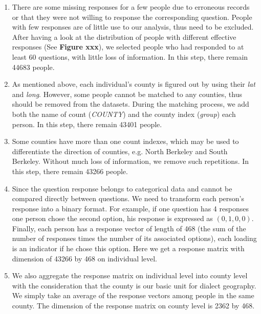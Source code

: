 \begin{enumerate}
\item There are some missing responses for a few people due to erroneous records or that they were not willing to response the corresponding question. People with few responses are of little use to our analysis, thus need to be excluded. After having a look at the distribution of people with different effective responses (See \textbf{Figure xxx}), we selected people who had responded to at least 60 questions, with little loss of information. In this step, there remain 44683 people.

\item As mentioned above, each individual's county is figured out by using their \textit{lat} and \textit{long}. However, some people cannot be matched to any counties, thus should be removed from the datasets. During the matching process, we add both the name of count (\textit{COUNTY}) and the county index (\textit{group}) each person. In this step, there remain 43401 people.

\item Some counties have more than one count indexes, which may be used to differentiate the direction of counties, e.g. North Berkeley and South Berkeley. Without much loss of information, we remove such repetitions. In this step, there remain 43266 people.

\item Since the question response belongs to categorical data and cannot be compared directly between questions. We need to transform each person's response into a binary format. For example, if one question has 4 responses one person chose the second option, his response is expressed as $(0,1,0,0)$. Finally, each person has a response vector of length of 468 (the sum of the number of responses times the number of its associated options), each loading is an indicator if he chose this option. Here we get a response matrix with dimension of 43266 by 468 on individual level.

\item We also aggregate the response matrix on individual level into county level with the consideration that the county is our basic unit for dialect geography. We simply take an average of the response vectors among people in the same county. The dimension of the response matrix on county level is 2362 by 468. 

\end{enumerate}

